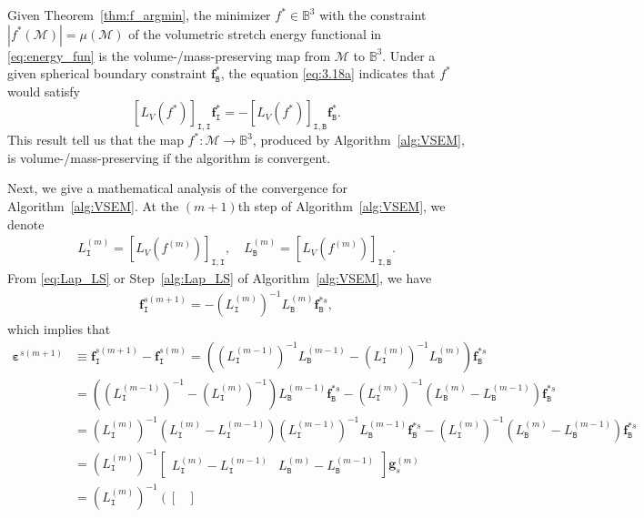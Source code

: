 \documentclass[onefignum,onetabnum]{siamonline220329}
\numberwithin{equation}{section}
\def\f{\mathbf{f}}
\def\M{\mathcal{M}}
\def\I{\mathtt{I}}
\def\B{\mathtt{B}}
\def\beps{{\boldsymbol{\varepsilon}}}
\begin{document}
\begin{sloppypar}
Given Theorem~\ref{thm:f_argmin}, the minimizer $f^{\ast} \in \mathbb{B}^3$ with the constraint $|f^*(\M)|=\mu(\M)$ of the volumetric stretch energy functional in \eqref{eq:energy_fun} is the volume-/mass-preserving map from $\mathcal{M}$ to $\mathbb{B}^3$. 
Under a given spherical boundary constraint $\f^*_\B$, the equation \eqref{eq:3.18a} indicates that $f^{\ast}$ would satisfy
\begin{equation} \label{eq:Lap_LS}
[L_V(f^*)]_{\I,\I} \f^*_\I = -[L_V(f^*)]_{\I,\B} \f^*_\B.
\end{equation}
This result tell us that the map $f^*:\mathcal{M} \to \mathbb{B}^3$, produced by Algorithm~\ref{alg:VSEM}, is volume-/mass-preserving if the algorithm is convergent.

Next, we give a mathematical analysis of the convergence for Algorithm~\ref{alg:VSEM}. 
At the $(m+1)$th step of Algorithm~\ref{alg:VSEM}, we denote
\begin{align*}
L_{\I}^{(m)} = [L_V(f^{(m)})]_{\I, \I}, \quad L_{\B}^{(m)} = [L_V(f^{(m)})]_{\I, \B}.
\end{align*}
From \eqref{eq:Lap_LS} or Step~\ref{alg:Lap_LS} of Algorithm~\ref{alg:VSEM}, we have
\begin{align}
      \f_{\I}^{s(m+1)} = - ( L_{\I}^{(m)})^{-1} L_{\B}^{(m)} \f_{\B}^{*s}, \label{eq:f_Is}
\end{align}
which implies that
\begin{subequations} \label{eq:eps_form}
\begin{align}
\beps^{s(m+1)} 
&\equiv  \f_{\I}^{s(m+1)} - \f_{\I}^{s(m)} = \left( ( L_{\I}^{(m-1)})^{-1} L_{\B}^{(m-1)} - ( L_{\I}^{(m)})^{-1} L_{\B}^{(m)} \right) \f_{\B}^{*s} \nonumber \\
&= \left( ( L_{\I}^{(m-1)} )^{-1} -( L_{\I}^{(m)} )^{-1}  \right) L_{\B}^{(m-1)} \f_{\B}^{*s} - ( L_{\I}^{(m)} )^{-1} \left( L_{\B}^{(m)} - L_{\B}^{(m-1)} \right) \f_{\B}^{*s} \nonumber \\
&= ( L_{\I}^{(m)} )^{-1} \left(  L_{\I}^{(m)}  - L_{\I}^{(m-1)}  \right) ( L_{\I}^{(m-1)} )^{-1} L_{\B}^{(m-1)} \f_{\B}^{*s} - ( L_{\I}^{(m)} )^{-1} \left( L_{\B}^{(m)} - L_{\B}^{(m-1)} \right) \f_{\B}^{*s} \nonumber \\
&= ( L_{\I}^{(m)} )^{-1} \begin{bmatrix} 
L_{\I}^{(m)}  - L_{\I}^{(m-1)}  & L_{\B}^{(m)} - L_{\B}^{(m-1)}
\end{bmatrix} \mathbf{g}^{(m)}_s \nonumber \\
&= \left( L_{\I}^{(m)} \right)^{-1} \left( \begin{bmatrix} 

\end{bmatrix}
\end{align}
\end{subequations}
\end{sloppypar}
\end{document}
